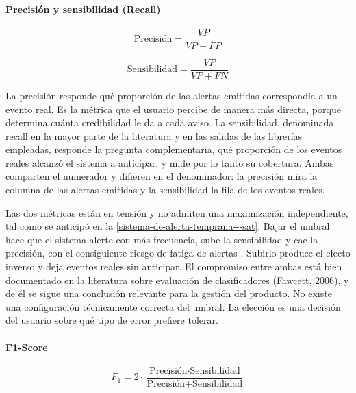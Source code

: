\paragraph{Precisión y sensibilidad (Recall)}

\begin{equation}
\text{Precisión} = \frac{VP}{VP + FP}
\label{eq:precision}
\end{equation}

\begin{equation}
\text{Sensibilidad} = \frac{VP}{VP + FN}
\label{eq:sensibilidad}
\end{equation}

La precisión responde qué proporción de las alertas emitidas correspondía a un evento real. Es la métrica que el usuario percibe de manera más directa, porque determina cuánta credibilidad le da a cada aviso. La sensibilidad, denominada recall en la mayor parte de la literatura y en las salidas de las librerías empleadas, responde la pregunta complementaria, qué proporción de los eventos reales alcanzó el sistema a anticipar, y mide por lo tanto su cobertura. Ambas comparten el numerador y difieren en el denominador: la precisión mira la columna de las alertas emitidas y la sensibilidad la fila de los eventos reales.

Las dos métricas están en tensión y no admiten una maximización independiente, tal como se anticipó en la \cref{sistema-de-alerta-temprana---sat}. Bajar el umbral hace que el sistema alerte con más frecuencia, sube la sensibilidad y cae la precisión, con el consiguiente riesgo de fatiga de alertas \autocite{ancker2017}. Subirlo produce el efecto inverso y deja eventos reales sin anticipar. El compromiso entre ambas está bien documentado en la literatura sobre evaluación de clasificadores (Fawcett, 2006), y de él se sigue una conclusión relevante para la gestión del producto. No existe una configuración técnicamente correcta del umbral. La elección es una decisión del usuario sobre qué tipo de error prefiere tolerar.

\paragraph{F1-Score}

\begin{equation}
F_1 = 2 \cdot \frac{\text{Precisión} \cdot \text{Sensibilidad}}{\text{Precisión} + \text{Sensibilidad}}
\label{eq:f1}
\end{equation}

